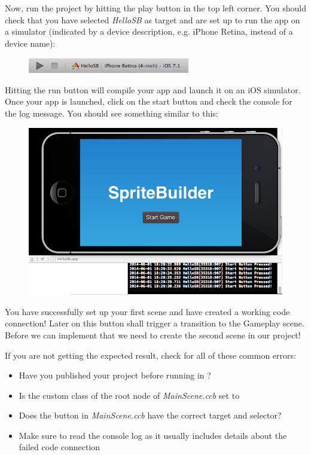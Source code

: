 Now, run the \xcode{} project by hitting the play button in the top left corner.
You should check that you have selected \textit{HelloSB} as target and are set
up to run the app on a simulator (indicated by a device description, e.g.
iPhone Retina, instead of a device name):
\begin{figure}[H]
		\centering
		\includegraphics[width=200pt]{images/firstproject/run_app.png}
\end{figure}
Hitting the run button will compile your app and launch it on an iOS simulator.
Once your app is launched, click on the start button and check the console for
the log message. You should see something similar to this:

\begin{figure}[H]
		\centering
		\includegraphics[width=0.9\linewidth]{images/firstproject/button_success_log.png}
\end{figure}

You have successfully set up your first \SB{} scene and have created a working
code connection! Later on this button shall trigger a transition to the Gameplay
scene. Before we can implement that we need to create the second
scene in our \SB{} project!

\begin{details}
If you are not getting the expected result, check for all of these common
errors:
\begin{itemize}
  \item Have you published your \SB{} project before running in \xcode{}?
  \item Is the custom class of the root node of \textit{MainScene.ccb} set to
  \item Does the button in \textit{MainScene.ccb} have the correct target and
  selector?
  \item Make sure to read the console log as it usually includes details about
  the failed code connection
\end{itemize}
\end{details}

